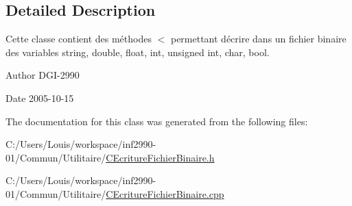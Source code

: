 \subsection{Detailed Description}
Cette classe contient des méthodes $<$ permettant d\textquotesingle{}écrire dans un fichier binaire des variables string, double, float, int, unsigned int, char, bool. 

\begin{DoxyAuthor}{Author}
D\+G\+I-\/2990 
\end{DoxyAuthor}
\begin{DoxyDate}{Date}
2005-\/10-\/15 
\end{DoxyDate}


The documentation for this class was generated from the following files\+:\begin{DoxyCompactItemize}
\item 
C\+:/\+Users/\+Louis/workspace/inf2990-\/01/\+Commun/\+Utilitaire/\hyperlink{_c_ecriture_fichier_binaire_8h}{C\+Ecriture\+Fichier\+Binaire.\+h}\item 
C\+:/\+Users/\+Louis/workspace/inf2990-\/01/\+Commun/\+Utilitaire/\hyperlink{_c_ecriture_fichier_binaire_8cpp}{C\+Ecriture\+Fichier\+Binaire.\+cpp}\end{DoxyCompactItemize}
